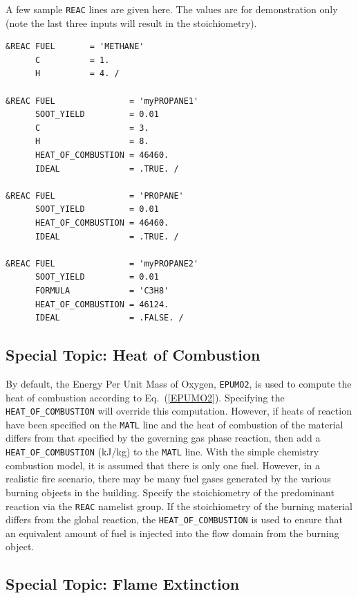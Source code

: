 \documentclass[11pt]{book}
\newcommand{\ct}{\tt\small}
\begin{document}
\noindent
A few sample {\ct REAC} lines are given here. The values are for demonstration only (note the last three inputs will result in the stoichiometry).


\footnotesize
\begin{verbatim}
&REAC FUEL       = 'METHANE'
      C          = 1.
      H          = 4. /

&REAC FUEL               = 'myPROPANE1'
      SOOT_YIELD         = 0.01
      C                  = 3.
      H                  = 8.
      HEAT_OF_COMBUSTION = 46460.
      IDEAL              = .TRUE. /

&REAC FUEL               = 'PROPANE'
      SOOT_YIELD         = 0.01
      HEAT_OF_COMBUSTION = 46460.
      IDEAL              = .TRUE. /

&REAC FUEL               = 'myPROPANE2'
      SOOT_YIELD         = 0.01
      FORMULA            = 'C3H8'
      HEAT_OF_COMBUSTION = 46124.
      IDEAL              = .FALSE. /
\end{verbatim}
\normalsize




\subsection{Special Topic: Heat of Combustion}
\label{info:heat_of_combustion}

By default, the Energy Per Unit Mass of Oxygen, {\ct EPUMO2}, is used to compute the heat of combustion according to
Eq.~(\ref{EPUMO2}).  Specifying the
{\ct HEAT\_OF\_COMBUSTION} will override this computation.
However, if heats of reaction have been specified on the
{\ct MATL} line and
the heat of combustion of the material differs from that specified by
the governing gas phase reaction, then add a
{\ct HEAT\_OF\_COMBUSTION} (kJ/kg) to the {\ct MATL} line.
With the simple chemistry combustion
model, it is assumed that there is only one fuel. However, in a realistic
fire scenario, there may be many fuel gases generated by the various
burning objects in the building. Specify
the stoichiometry of the predominant reaction via the {\ct REAC}
namelist group. If the stoichiometry of the burning material
differs from the global reaction, the {\ct HEAT\_OF\_COMBUSTION} is
used to ensure that an equivalent amount of fuel is injected into the
flow domain from the burning object.

\subsection{Special Topic: Flame Extinction}
\end{document}
